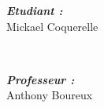\begin{titlepage}
\begin{minipage}{0.5\textwidth} %
    \begin{flushleft} \large %
    \emph{\textbf{Etudiant :}}\\ %
    Mickael Coquerelle \\ %
    \end{flushleft}
\end{minipage}
~
\begin{minipage}{0.4\textwidth}
    \begin{flushright} \large
    \emph{\textbf{Professeur :}} \\
     Anthony Boureux \\
    \end{flushright}
\end{minipage}\\

\vspace{2cm}

\begin{quote}
    \itshape
\end{quote}
\vspace{1cm}
\begin{flushright}
    \itshape
\end{flushright}
\vspace{5mm}

\end{titlepage}

